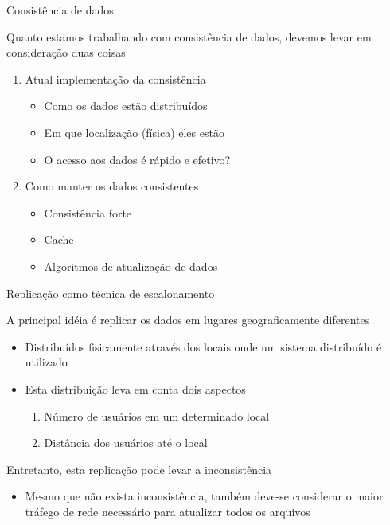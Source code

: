 \documentclass[compress]{beamer}
\begin{document}

\begin{frame}{Consistência de dados}

Quanto estamos trabalhando com consistência de dados, devemos levar em consideração duas coisas

\vspace{0.5cm}

\begin{enumerate}
    \item Atual implementação da consistência
    \begin{itemize}
        \item Como os dados estão distribuídos
        \item Em que localização (física) eles estão
        \item O acesso aos dados é rápido e efetivo?
    \end{itemize}
    \vspace{0.5cm}
    \item Como manter os dados consistentes
    \begin{itemize}
        \item Consistência forte
        \item Cache
        \item Algoritmos de atualização de dados
    \end{itemize}
\end{enumerate}
\end{frame}


\begin{frame}{Replicação como técnica de escalonamento}

A principal idéia é replicar os dados em lugares geograficamente diferentes
\begin{itemize}
    \item Distribuídos fisicamente através dos locais onde um sistema distribuído é utilizado
    \item Esta distribuição leva em conta dois aspectos
    \begin{enumerate}
        \item Número de usuários em um determinado local
        \item Distância dos usuários até o local
    \end{enumerate}
\end{itemize}

\vspace{0.5cm}

Entretanto, esta replicação pode levar a inconsistência
\begin{itemize}
    \item Mesmo que não exista inconsistência, também deve-se considerar o maior tráfego de rede necessário para atualizar todos os arquivos
\end{itemize}
\end{frame}
\end{document}
